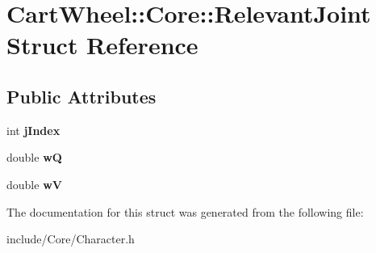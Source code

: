 \hypertarget{structCartWheel_1_1Core_1_1RelevantJoint}{
\section{CartWheel::Core::RelevantJoint Struct Reference}
\label{structCartWheel_1_1Core_1_1RelevantJoint}
}
\subsection*{Public Attributes}
\begin{DoxyCompactItemize}
\item 
\hypertarget{structCartWheel_1_1Core_1_1RelevantJoint_aaaa057aee26f3b411f6521739d26ad13}{
int {\bfseries jIndex}}
\label{structCartWheel_1_1Core_1_1RelevantJoint_aaaa057aee26f3b411f6521739d26ad13}

\item 
\hypertarget{structCartWheel_1_1Core_1_1RelevantJoint_ae93eca7639a1c2b34398498c8707e54c}{
double {\bfseries wQ}}
\label{structCartWheel_1_1Core_1_1RelevantJoint_ae93eca7639a1c2b34398498c8707e54c}

\item 
\hypertarget{structCartWheel_1_1Core_1_1RelevantJoint_af80e5316640edde5811c95ea70b841c0}{
double {\bfseries wV}}
\label{structCartWheel_1_1Core_1_1RelevantJoint_af80e5316640edde5811c95ea70b841c0}

\end{DoxyCompactItemize}


The documentation for this struct was generated from the following file:\begin{DoxyCompactItemize}
\item 
include/Core/Character.h\end{DoxyCompactItemize}
